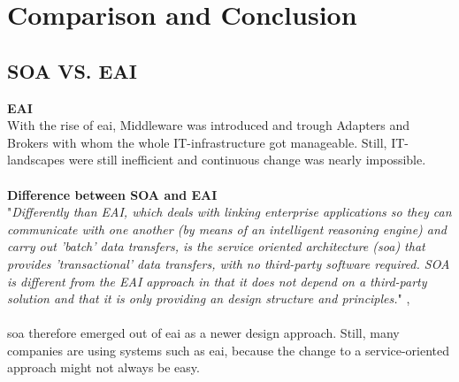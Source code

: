 \documentclass[12pt]{article}
\begin{document}
\section{Comparison and Conclusion}
\subsection{SOA VS. EAI}
\textbf{EAI}\\
With the rise of \gls{eai}, Middleware was introduced and trough Adapters and Brokers with whom the whole IT-infrastructure got manageable. Still, IT-landscapes were still inefficient and continuous change was nearly impossible.\cite[page 115]{te}
\\
\\\textbf{Difference between SOA and EAI}\\
"\textit{Differently than EAI, which deals with linking enterprise applications so they can communicate with one another (by means of an intelligent reasoning engine) and carry out 'batch' data transfers, is the service oriented architecture (\gls{soa}) that provides 'transactional' data transfers, with no third-party software required. SOA is different from the EAI approach in that it does not depend on a third-party solution and that it is only providing an design structure and principles.}" ,\cite{soadef}\\
\\
\gls{soa} therefore emerged out of \gls{eai} as a newer design approach. Still, many companies are using systems such as \gls{eai}, because the change to a service-oriented approach might not always be easy. 
\end{document}
